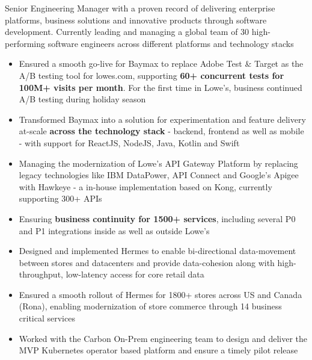\documentclass[10pt,a4paper,ragged2e,withhyper]{altacv}
\begin{document}
\begin{paracol}{2}

\begin{p}
Senior Engineering Manager with a proven record of delivering enterprise platforms, business solutions and innovative products through software development. Currently leading and managing a global team of 30 high-performing software engineers across different platforms and technology stacks
\end{p}


\begin{itemize}
\item Ensured a smooth go-live for Baymax to replace Adobe Test \& Target as the A/B testing tool for lowes.com, supporting \textbf{60+ concurrent tests for 100M+ visits per month}. For the first time in Lowe's, business continued A/B testing during holiday season
\item Transformed Baymax into a solution for experimentation and feature delivery at-scale \textbf{across the technology stack} - backend, frontend as well as mobile - with support for ReactJS, NodeJS, Java, Kotlin and Swift
\item Managing the modernization of Lowe's API Gateway Platform by replacing legacy technologies like IBM DataPower, API Connect and Google's Apigee with Hawkeye - a in-house implementation based on Kong, currently supporting 300+ APIs
\item Ensuring \textbf{business continuity for 1500+ services}, including several P0 and P1 integrations inside as well as outside Lowe's
\end{itemize}

\begin{itemize}
\item Designed and implemented Hermes to enable bi-directional data-movement between stores and datacenters and provide data-cohesion along with high-throughput, low-latency access for core retail data
\item Ensured a smooth rollout of Hermes for 1800+ stores across US and Canada (Rona), enabling modernization of store commerce through 14 business critical services
\item Worked with the Carbon On-Prem engineering team to design and deliver the MVP Kubernetes operator based platform and ensure a timely pilot release
\end{itemize}


\end{paracol}
\end{document}
